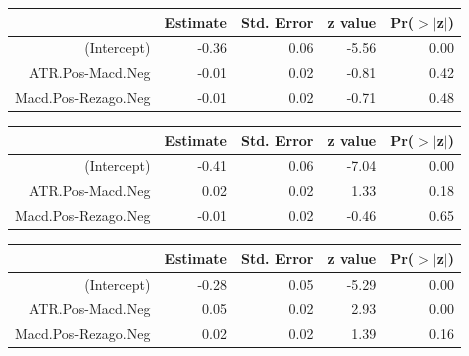 \documentclass[a4paper,12pt]{Latex/Classes/PhDthesisPSnPDF}
\begin{document}
\begin{center}
\begin{table}[ht]
\centering
\begin{tabular}{rrrrr}
  \hline
 & Estimate & Std. Error & z value & Pr($>$$|$z$|$) \\ 
  \hline
(Intercept) & -0.36 & 0.06 & -5.56 & 0.00 \\ 
  ATR.Pos-Macd.Neg & -0.01 & 0.02 & -0.81 & 0.42 \\ 
  Macd.Pos-Rezago.Neg & -0.01 & 0.02 & -0.71 & 0.48 \\ 
   \hline
\end{tabular}
\end{table}\end{center}

\begin{center}
\begin{table}[ht]
\centering
\begin{tabular}{rrrrr}
  \hline
 & Estimate & Std. Error & z value & Pr($>$$|$z$|$) \\ 
  \hline
(Intercept) & -0.41 & 0.06 & -7.04 & 0.00 \\ 
  ATR.Pos-Macd.Neg & 0.02 & 0.02 & 1.33 & 0.18 \\ 
  Macd.Pos-Rezago.Neg & -0.01 & 0.02 & -0.46 & 0.65 \\ 
   \hline
\end{tabular}
\end{table}\end{center}

\newpage
\begin{center}
\begin{table}[ht]
\centering
\begin{tabular}{rrrrr}
  \hline
 & Estimate & Std. Error & z value & Pr($>$$|$z$|$) \\ 
  \hline
(Intercept) & -0.28 & 0.05 & -5.29 & 0.00 \\ 
  ATR.Pos-Macd.Neg & 0.05 & 0.02 & 2.93 & 0.00 \\ 
  Macd.Pos-Rezago.Neg & 0.02 & 0.02 & 1.39 & 0.16 \\ 
   \hline
\end{tabular}
\end{table}\end{center}
\end{document}
